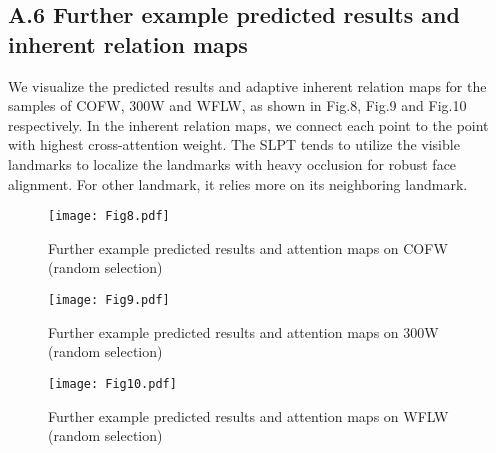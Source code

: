 \documentclass[10pt,twocolumn,letterpaper]{article}
\begin{document}
\subsection*{A.6 Further example predicted results and inherent relation maps}
We visualize the predicted results and adaptive inherent relation maps for the samples of COFW, 300W and WFLW, as shown in Fig.8, Fig.9 and Fig.10 respectively. In the inherent relation maps, we connect each point to the point with highest cross-attention weight. The SLPT tends to utilize the visible landmarks to localize the landmarks with heavy occlusion for robust face alignment. For other landmark, it relies more on its neighboring landmark. 

\begin{figure}[H]
	\centering
	\texttt{[image: Fig8.pdf]}
	\caption{Further example predicted results and attention maps on COFW (random selection)}
	\label{fig8}
\end{figure}

\begin{figure}[H]
	\centering
	\texttt{[image: Fig9.pdf]}
	\caption{Further example predicted results and attention maps on 300W (random selection)}
	\label{fig9}
\end{figure}

\begin{figure}[H]
	\centering
	\texttt{[image: Fig10.pdf]}
	\caption{Further example predicted results and attention maps on WFLW (random selection)}
	\label{fig10}
\end{figure}
\end{document}
